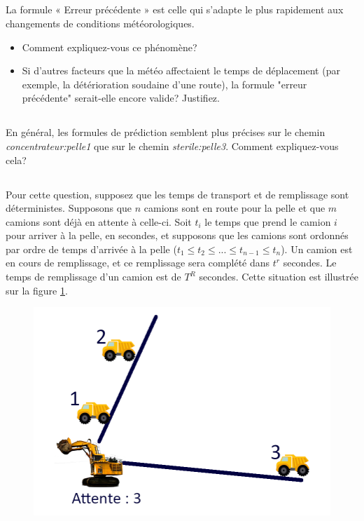 \documentclass[letterpaper,12pt]{article}
\begin{document}
	\subsection{}
	La formule « Erreur précédente » est celle qui s’adapte le plus rapidement aux changements de conditions météorologiques. 
	\begin{itemize}
		\item Comment expliquez-vous ce phénomène? 
		\item Si d’autres facteurs que la météo affectaient le temps de déplacement (par exemple, la détérioration soudaine d'une route), la formule "erreur précédente" serait-elle encore valide? Justifiez.
	\end{itemize}

	\subsection{}
	En général, les formules de prédiction semblent plus précises sur le chemin \textit{concentrateur:pelle1} que sur le chemin \textit{sterile:pelle3}. Comment expliquez-vous cela?
	
	\subsection{}
	
	Pour cette question, supposez que les temps de transport et de remplissage sont déterministes. Supposons que $n$ camions sont en route pour la pelle et que $m$ camions sont déjà en attente à celle-ci. Soit $t_i$ le temps que prend le camion $i$ pour arriver à la pelle, en secondes, et supposons que les camions sont ordonnés par ordre de temps d'arrivée à la pelle ($t_1 \leq t_2 \leq ...\leq t_{n-1} \leq t_n$). Un camion est en cours de remplissage, et ce remplissage sera complété dans $t^r$ secondes. Le temps de remplissage d'un camion est de $T^R$ secondes. Cette situation est illustrée sur la figure \ref{fig:file}.
	
	\begin{figure}
		\center
		\includegraphics[width=0.4\linewidth]{File.png}
		\caption{\label{fig:file}}
	\end{figure}
	
\end{document}
